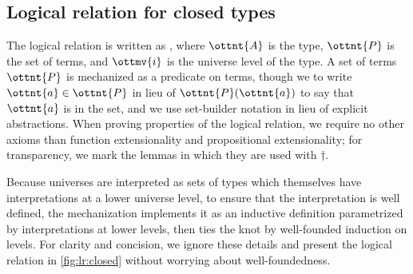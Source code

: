\documentclass[a4paper,UKenglish,cleveref,autoref,thm-restate]{lipics-v2021}
\begin{document}
\subsection{Logical relation for closed types}

The logical relation is written as ,
where $\ottnt{A}$ is the type, $\ottnt{P}$ is the set of terms,
and $\ottmv{i}$ is the universe level of the type.
A set of terms $\ottnt{P}$ is mechanized as a predicate on terms,
though we to write $ \ottnt{a}  \in  \ottnt{P} $ in lieu of $\ottnt{P}(\ottnt{a})$
to say that $\ottnt{a}$ is in the set,
and we use set-builder notation in lieu of explicit abstractions.
When proving properties of the logical relation,
we require no other axioms than function extensionality and propositional extensionality;
for transparency, we mark the lemmas in which they are used with $\dagger$.

Because universes are interpreted as sets of types
which themselves have interpretations at a lower universe level,
to ensure that the interpretation is well defined,
the mechanization implements it as an inductive definition
parametrized by interpretations at lower levels,
then ties the knot by well-founded induction on levels.
For clarity and concision, we ignore these details
and present the logical relation in \cref{fig:lr:closed}
without worrying about well-foundedness.
\end{document}
